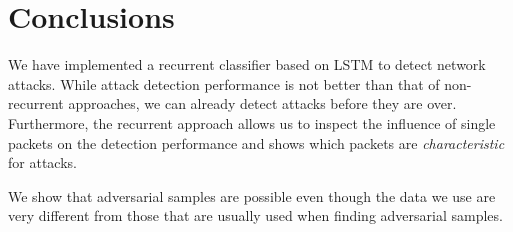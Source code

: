 \documentclass[sigconf,nonacm]{acmart}
\begin{document}
\section{Conclusions}

We have implemented a recurrent classifier based on LSTM to detect network attacks. While attack detection performance is not better than that of non-recurrent approaches, we can already detect attacks before they are over. Furthermore, the recurrent approach allows us to inspect the influence of single packets on the detection performance and shows which packets are \textit{characteristic} for attacks.

We show that adversarial samples are possible even though the data we use are very different from those that are usually used when finding adversarial samples.



\end{document}
